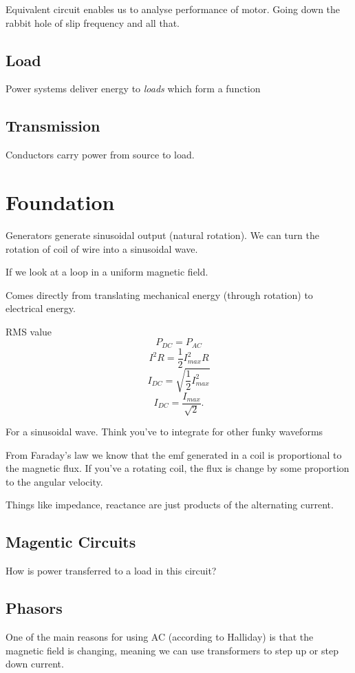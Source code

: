 \documentclass[11pt]{article}
\begin{document}
Equivalent circuit enables us to analyse performance of motor.
Going down the rabbit hole of slip frequency and all that.

\subsection{Load}

Power systems deliver energy to \textit{loads} which form a function

\subsection{Transmission}

Conductors carry power from source to load.

\section{Foundation}


Generators generate sinusoidal output (natural rotation).
We can turn the rotation of coil of wire into a sinusoidal wave.

If we look at a loop in a uniform magnetic field.

Comes directly from translating mechanical energy (through rotation) to
electrical energy.

RMS value
\[
P_{DC} = P_{AC}
\] 
\[
I^2R = \frac{1}{2}I_{max}^2R
\] 
\[
I_{DC} = \sqrt{\frac{1}{2}I_{max}^2} 
\] 
\[
I_{DC} = \frac{I_{max}}{\sqrt{2} }

.\] 

For a sinusoidal wave. Think you've to integrate for other funky waveforms

From Faraday's law we know that the emf generated in a coil is proportional to
the magnetic flux. If you've a rotating coil, the flux is change by some
proportion to the angular velocity. 

Things like impedance, reactance are just products of the alternating current.

\subsection{Magentic Circuits}

How is power transferred to a load in this circuit?

\subsection{Phasors}

One of the main reasons for using AC (according to Halliday) is that the
magnetic field is changing, meaning we can use transformers to step up or step
down current.
\end{document}
